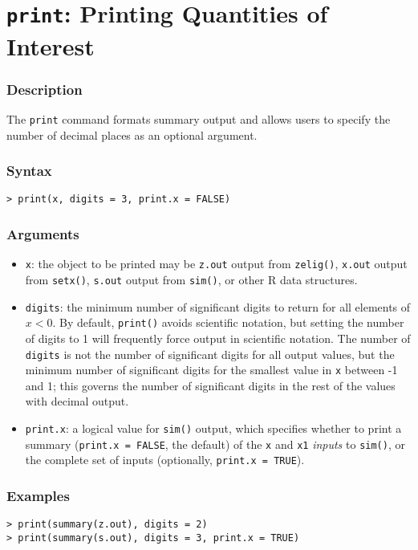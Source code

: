 \section{{\tt print}: Printing Quantities of Interest}
\label{ss:print}

\subsubsection{Description}
The {\tt print} command formats summary output and allows users to
specify the number of decimal places as an optional argument.  

\subsubsection{Syntax}
\begin{verbatim}
> print(x, digits = 3, print.x = FALSE)
\end{verbatim}

\subsubsection{Arguments}

\begin{itemize}
\item {\tt x}: the object to be printed may be {\tt z.out} output
  from {\tt zelig()}, {\tt x.out} output from {\tt setx()}, {\tt s.out}
  output from {\tt sim()}, or other R data structures.
\item {\tt digits}: the minimum number of significant digits to return
  for all elements of $x < 0$.  By default, {\tt print()} avoids
  scientific notation, but setting the number of digits to 1 will
  frequently force output in scientific notation.  The number of {\tt
    digits} is not the number of significant digits for all output
  values, but the minimum number of significant digits for the
  smallest value in {\tt x} between -1 and 1; this governs the number
  of significant digits in the rest of the values with decimal output.
\item {\tt print.x}: a logical value for {\tt sim()} output, which
  specifies whether to print a summary ({\tt print.x = FALSE}, the
  default) of the {\tt x} and {\tt x1} \emph{inputs} to {\tt sim()},
  or the complete set of inputs (optionally, {\tt print.x = TRUE}).
\end{itemize}

\subsubsection{Examples}
\begin{verbatim}
> print(summary(z.out), digits = 2)
> print(summary(s.out), digits = 3, print.x = TRUE)
\end{verbatim}

